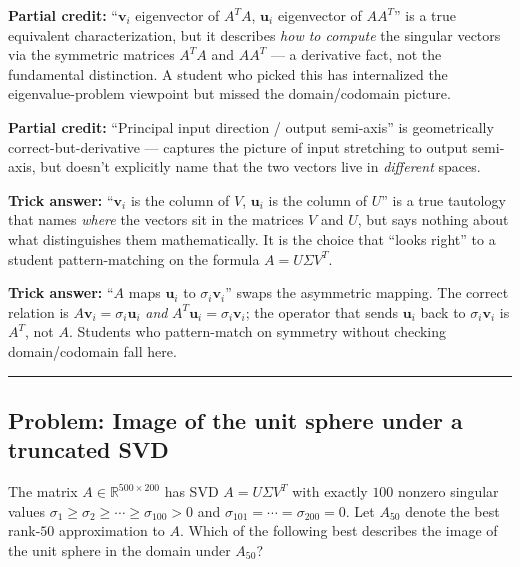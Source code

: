 \documentclass[12pt]{amsart}
\newcommand{\divider}{
  \vspace{-1em}
  \noindent
  \raisebox{-0.15ex}{\textbullet}%
  \hspace{0.5em}%
  \rule[0.5ex]{0.95\textwidth}{1.0pt}%
  \hspace{0.5em}%
  \raisebox{-0.15ex}{\textbullet}%
  \vspace{0em}
}
\begin{document}
\textbf{Partial credit:}
``$\mathbf{v}_i$ eigenvector of $A^TA$, $\mathbf{u}_i$ eigenvector of $AA^T$''
is a true equivalent characterization, but it describes \emph{how to
compute} the singular vectors via the symmetric matrices $A^TA$ and $AA^T$
--- a derivative fact, not the fundamental distinction. A student who
picked this has internalized the eigenvalue-problem viewpoint but missed
the domain/codomain picture.

\textbf{Partial credit:}
``Principal input direction / output semi-axis'' is geometrically
correct-but-derivative --- captures the picture of input stretching to
output semi-axis, but doesn't explicitly name that the two vectors live
in \emph{different} spaces.

\textbf{Trick answer:}
``$\mathbf{v}_i$ is the column of $V$, $\mathbf{u}_i$ is the column of $U$''
is a true tautology that names \emph{where} the vectors sit in the matrices
$V$ and $U$, but says nothing about what distinguishes them mathematically.
It is the choice that ``looks right'' to a student pattern-matching on the
formula $A = U\Sigma V^T$.

\textbf{Trick answer:}
``$A$ maps $\mathbf{u}_i$ to $\sigma_i \mathbf{v}_i$'' swaps the asymmetric
mapping. The correct relation is $A\mathbf{v}_i = \sigma_i \mathbf{u}_i$
\emph{and} $A^T\mathbf{u}_i = \sigma_i \mathbf{v}_i$; the operator that
sends $\mathbf{u}_i$ back to $\sigma_i \mathbf{v}_i$ is $A^T$, not $A$.
Students who pattern-match on symmetry without checking domain/codomain
fall here.

\divider

\subsection*{Problem: Image of the unit sphere under a truncated SVD}

The matrix $A \in \mathbb{R}^{500 \times 200}$ has SVD $A = U\Sigma V^T$ with
exactly $100$ nonzero singular values
$\sigma_1 \geq \sigma_2 \geq \cdots \geq \sigma_{100} > 0$ and
$\sigma_{101} = \cdots = \sigma_{200} = 0$. Let $A_{50}$ denote the best
rank-$50$ approximation to $A$. Which of the following best describes the
image of the unit sphere in the domain under $A_{50}$?
\end{document}
